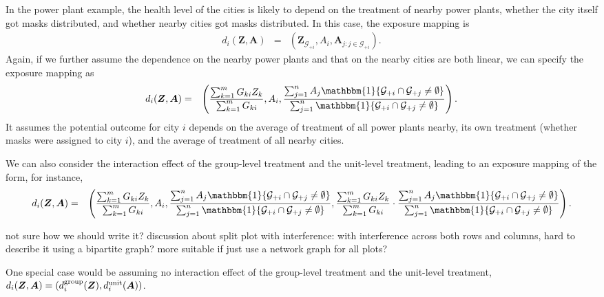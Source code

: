 \documentclass{article}
\newenvironment{continuance}[1]
{%
  \newcommand{\continuanceref}{\ref{#1}}%
  \continuancex %
}
{\endcontinuancex}
\newcommand{\bZ}{\boldsymbol{Z}}
\newcommand{\bA}{\boldsymbol{A}}
\newcommand{\indicator}{\mathbbm{1}}
\newcommand{\cG}{\mathcal{G}}
\newcommand{\sumj}{\sum_{j=1}^n}
\newcommand{\sumk}{\sum_{k=1}^m}
\begin{document}
\begin{continuance}{exmp::power_plant}
    In the power plant example, the health level of the cities is likely to depend on the treatment of nearby power plants, whether the city itself got masks distributed, and whether nearby cities got masks distributed. In this case, the exposure mapping is 
    \begin{eqnarray*}
        d_i(\bZ,\bA) &=& (\bZ_{\cG_{+i}}, A_i,\bA_{j:j\in\cG_{+i}}).
    \end{eqnarray*}
    Again, if we further assume the dependence on the nearby power plants and that on the nearby cities are both linear, we can specify the exposure mapping as
    \begin{eqnarray*}
        d_i(\bZ,\bA) &=& \left(\frac{\sumk G_{ki}Z_{k}}{\sumk G_{ki}},A_i,\frac{\sumj A_j \indicator\{\cG_{+i} \cap \cG_{+j} \neq \emptyset\}}{\sumj \indicator\{\cG_{+i} \cap \cG_{+j} \neq \emptyset\}} \right).
    \end{eqnarray*}
    It assumes the potential outcome for city $i$ depends on the average of treatment of all power plants nearby, its own treatment (whether masks were assigned to city $i$), and the average of treatment of all nearby cities.

    We can also consider the interaction effect of the group-level treatment and the unit-level treatment, leading to an exposure mapping of the form, for instance, 
    \begin{eqnarray*}
        d_i(\bZ,\bA) &=& \left(\frac{\sumk G_{ki}Z_{k}}{\sumk G_{ki}},A_i,\frac{\sumj A_j \indicator\{\cG_{+i} \cap \cG_{+j} \neq \emptyset\}}{\sumj \indicator\{\cG_{+i} \cap \cG_{+j} \neq \emptyset\}}, \frac{\sumk G_{ki}Z_{k}}{\sumk G_{ki}}\cdot\frac{\sumj A_j \indicator\{\cG_{+i} \cap \cG_{+j} \neq \emptyset\}}{\sumj \indicator\{\cG_{+i} \cap \cG_{+j} \neq \emptyset\}} \right).
    \end{eqnarray*}
\end{continuance}

\begin{continuance}{exmp::split_plot}
    not sure how we should write it? discussion about split plot with interference: with interference across both rows and columns, hard to describe it using a bipartite graph? more suitable if just use a network graph for all plots?
\end{continuance}

One special case would be assuming no interaction effect of the group-level treatment and the unit-level treatment, $d_i(\bZ,\bA)=(d_{i}^{\textup{group}}(\bZ),d_{i}^{\textup{unit}}(\bA))$.
\end{document}
